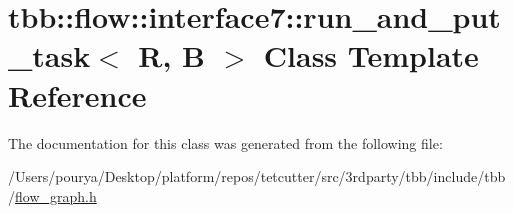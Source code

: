 \hypertarget{classtbb_1_1flow_1_1interface7_1_1run__and__put__task}{}\section{tbb\+:\+:flow\+:\+:interface7\+:\+:run\+\_\+and\+\_\+put\+\_\+task$<$ R, B $>$ Class Template Reference}
\label{classtbb_1_1flow_1_1interface7_1_1run__and__put__task}


The documentation for this class was generated from the following file\+:\begin{DoxyCompactItemize}
\item 
/\+Users/pourya/\+Desktop/platform/repos/tetcutter/src/3rdparty/tbb/include/tbb/\hyperlink{flow__graph_8h}{flow\+\_\+graph.\+h}\end{DoxyCompactItemize}
